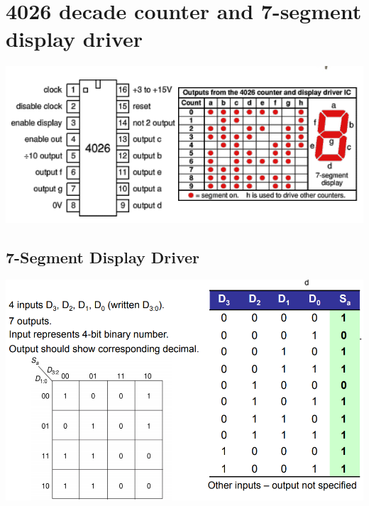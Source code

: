 \documentclass{article}[18pt]
\begin{document}
\section{4026 decade counter and 7-segment display driver}
\begin{center}
	\includegraphics[scale=0.5]{4026decade}
\end{center}
\subsection{7-Segment Display Driver}
\begin{center}
	\includegraphics[scale=0.5]{7seg}
\end{center}
\end{document}
